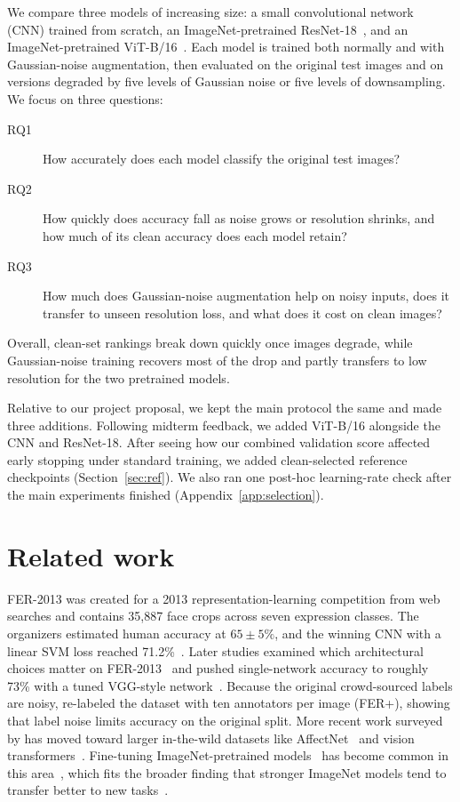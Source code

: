 \documentclass{article}
\begin{document}
We compare three models of increasing size: a small convolutional network (CNN) trained from scratch, an
ImageNet-pretrained ResNet-18~\cite{he2016resnet}, and an ImageNet-pretrained ViT-B/16~\cite{dosovitskiy2021vit}. Each
model is trained both normally and with Gaussian-noise augmentation, then evaluated on the original test images and on
versions degraded by five levels of Gaussian noise or five levels of downsampling. We focus on three questions:
\begin{description}
  \item[RQ1] How accurately does each model classify the original test images?
  \item[RQ2] How quickly does accuracy fall as noise grows or resolution shrinks, and how much of its clean accuracy
  does each model retain?
  \item[RQ3] How much does Gaussian-noise augmentation help on noisy inputs, does it transfer to unseen resolution
  loss, and what does it cost on clean images?
\end{description}

Overall, clean-set rankings break down quickly once images degrade, while Gaussian-noise training recovers most of the
drop and partly transfers to low resolution for the two pretrained models.

Relative to our project proposal, we kept the main protocol the same and made three additions. Following midterm
feedback, we added ViT-B/16 alongside the CNN and ResNet-18. After seeing how our combined validation score affected
early stopping under standard training, we added clean-selected reference checkpoints (Section~\ref{sec:ref}). We also
ran one post-hoc learning-rate check after the main experiments finished (Appendix~\ref{app:selection}).

\section{Related work}
\label{sec:related}

FER-2013 was created for a 2013 representation-learning competition from web searches and contains 35,887 face crops
across seven expression classes. The organizers estimated human accuracy at $65\pm5\%$, and the winning CNN with a
linear SVM loss reached 71.2\%~\cite{goodfellow2013challenges,tang2013svm}. Later studies examined which architectural
choices matter on FER-2013~\cite{pramerdorfer2016fer} and pushed single-network accuracy to roughly 73\% with a tuned
VGG-style network~\cite{khaireddin2021fer}. Because the original crowd-sourced labels are noisy,
\citet{barsoum2016ferplus} re-labeled the dataset with ten annotators per image (FER+), showing that label noise limits
accuracy on the original split. More recent work surveyed by \citet{li2020deepfer} has moved toward larger in-the-wild
datasets like AffectNet~\cite{mollahosseini2019affectnet} and vision transformers~\cite{ma2021vtff,zheng2022poster}.
Fine-tuning ImageNet-pretrained models~\cite{deng2009imagenet} has become common in this area~\cite{li2021transfer},
which fits the broader finding that stronger ImageNet models tend to transfer better to new
tasks~\cite{kornblith2019better}.
\end{document}
